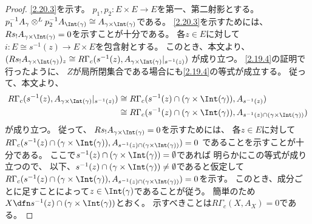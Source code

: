 \documentclass[uplatex,dvipdfmx]{jsarticle}
\begin{document}
\begin{proof}
  \ref{2.20.3}を示す。
  \(p_1,p_2:E\times E\to E\)を第一、第二射影とする。
  \(p_1^{-1}A_{\gamma}\otimes^L p_2^{-1}A_{\Int(\gamma)}
  \cong A_{\gamma\times \Int(\gamma)}\)である。
  \ref{2.20.3}を示すためには、
  \(Rs_!A_{\gamma\times \Int(\gamma)} = 0\)を示すことが十分である。
  各\(z\in E\)に対して
  \(i:E\cong s^{-1}(z) \to E\times E\)を包含射とする。
  このとき、本文\cite[Proposition 2.6.7]{kashiwara2002sheaves}より、
  \((Rs_!A_{\gamma\times \Int(\gamma)})_z \cong
  R\Gamma_c(s^{-1}(z), A_{\gamma\times \Int(\gamma)}|_{s^{-1}(z)})\)
  が成り立つ。
  \autoref{2.19.4}の証明で行ったように、
  \(Z\)が局所閉集合である場合にも\autoref{2.19.4}の等式が成立する。
  従って、本文\cite[Remark 2.6.9 (iii)]{kashiwara2002sheaves}より、
  \begin{align*}
    R\Gamma_c(s^{-1}(z), A_{\gamma\times \Int(\gamma)}|_{s^{-1}(z)}) &\cong
    R\Gamma_c(s^{-1}(z)\cap (\gamma\times \Int(\gamma)), A_{s^{-1}(z)}) \\
    &\cong R\Gamma_c(s^{-1}(z)\cap (\gamma\times \Int(\gamma)),
    A_{s^{-1}(z)\cap (\gamma\times \Int(\gamma))})
  \end{align*}
  が成り立つ。
  従って、
  \(Rs_!A_{\gamma\times \Int(\gamma)} = 0\)を示すためには、
  各\(z\in E\)に対して
  \(R\Gamma_c(s^{-1}(z)\cap (\gamma\times \Int(\gamma)),
  A_{s^{-1}(z)\cap (\gamma\times \Int(\gamma))}) = 0\)
  であることを示すことが十分である。
  ここで\(s^{-1}(z)\cap (\gamma\times \Int(\gamma)) = \emptyset\)であれば
  明らかにこの等式が成り立つので、
  以下、\(s^{-1}(z)\cap (\gamma\times \Int(\gamma)) \neq \emptyset\)であると仮定して
  \(R\Gamma_c(s^{-1}(z)\cap (\gamma\times \Int(\gamma)),
  A_{s^{-1}(z)\cap (\gamma\times \Int(\gamma))}) = 0\)を示す。
  このとき、成分ごとに足すことによって\(z\in \Int(\gamma)\)であることが従う。
  簡単のため
  \(X \dfn s^{-1}(z)\cap (\gamma\times \Int(\gamma))\)とおく。
  示すべきことは\(R\Gamma_c(X,A_X)=0\)である。


\end{proof}
\end{document}
